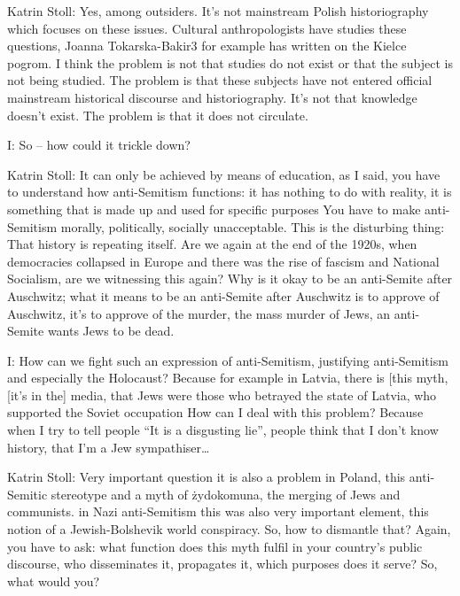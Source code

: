  

Katrin Stoll: Yes, among outsiders. It’s not mainstream Polish historiography which focuses on these issues. Cultural anthropologists have studies these questions, Joanna Tokarska-Bakir3 for example has written on the Kielce pogrom. I think the problem is not that studies do not exist or that the subject is not being studied. The problem is that these subjects have not entered official mainstream historical discourse and historiography. It’s not that knowledge doesn’t exist. The problem is that it does not circulate.  

 

I: So – how could it trickle down? 

 

Katrin Stoll:  It can only be achieved by means of education, as I said, you have to understand how anti-Semitism functions: it has nothing to do with reality, it is something that is made up and used for specific purposes You have to make anti-Semitism morally, politically, socially unacceptable. This is the disturbing thing: That history is repeating itself. Are we again at the end of the 1920s, when democracies collapsed in Europe and there was the rise of fascism and National Socialism, are we witnessing this again?  Why is it okay to be an anti-Semite after Auschwitz; what it means to be an anti-Semite after Auschwitz is to approve of Auschwitz, it’s to approve of the murder, the mass murder of Jews, an anti-Semite wants Jews to be dead.  

 

I: How can we fight such an expression of anti-Semitism, justifying anti-Semitism and especially the Holocaust? Because for example in Latvia, there is [this myth, [it’s in the] media, that Jews were those who betrayed the state of Latvia, who supported the Soviet occupation How can I deal with this problem? Because when I try to tell people “It is a disgusting lie”, people think that I don’t know history, that I’m a Jew sympathiser… 

 

Katrin Stoll: Very important question it is also a problem in Poland, this anti-Semitic stereotype and a myth of żydokomuna, the merging of Jews and communists.  in Nazi anti-Semitism this was also very important element, this notion of a Jewish-Bolshevik world conspiracy. So, how to dismantle that? Again, you have to ask: what function does this myth fulfil in your country’s public discourse, who disseminates it, propagates it, which purposes does it serve? So, what would you? 

